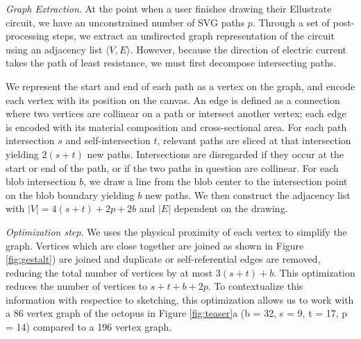 \documentclass{sigchi}
\begin{document}
      \textit{Graph Extraction}.
      At the point when a user finishes drawing their Ellustrate circuit, we have an unconstrained number of SVG paths $p$. 
      Through a set of post-processing steps, we extract an undirected graph representation of the circuit using an adjacency list $\langle V, E \rangle$. However, because the direction of electric current takes the path of least resistance, we must first decompose intersecting paths.
      
    We represent the start and end of each path as a vertex on the graph, and encode each vertex with its position on the canvas. An edge is defined as a connection where two vertices are collinear on a path or intersect another vertex; each edge is encoded with its material composition and cross-sectional area. For each path intersection $s$ and self-intersection $t$, relevant paths are sliced at that intersection yielding $2(s + t)$ new paths. Intersections are disregarded if they occur at the start or end of the path, or if the two paths in question are collinear. For each blob intersection $b$, we draw a line from the blob center to the intersection point on the blob boundary yielding $b$ new paths. We then construct the adjacency list with $|V| = 4(s + t) + 2p + 2b $ and $|E|$ dependent on the drawing.

      \textit{Optimization step}. We uses the physical proximity of each vertex to simplify the graph. Vertices which are close together are joined as shown in Figure \ref{fig:gestalt}) are joined and duplicate or self-referential edges are removed, reducing the total number of vertices by at most $3(s + t) + b$. This optimization reduces the number of vertices to $s + t + b + 2p$. To contextualize this information with respectice to sketching, this optimization allows us to work with a 86 vertex graph of the octopus in Figure \ref{fig:teaser}a (b = 32, s = 9, t = 17, p = 14) compared to a 196 vertex graph.
\end{document}
